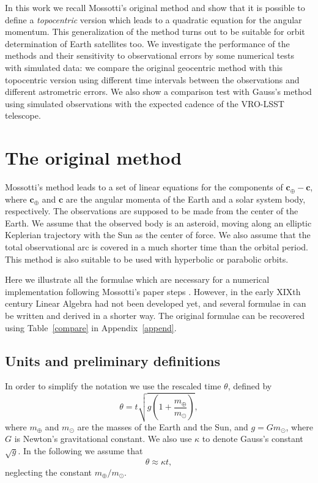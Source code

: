 \documentclass[11pt]{article}
\def\angmom{\bm{c}}
\def\angmom{{\bm{c}}}
\begin{document}
In this work we recall Mossotti's original method and show that it is possible to define a {\em topocentric} version which leads to a quadratic equation for the angular momentum.
This generalization of the method turns out to be suitable for orbit determination of Earth satellites too. 
We investigate the performance of the methods and their sensitivity to observational errors by some numerical tests with simulated data: we compare the original geocentric method with this topocentric version using different time intervals between the observations and different astrometric errors. 
We also show a comparison test with Gauss's method using simulated observations with the expected cadence of the VRO-LSST telescope.



\section{The original method}
\label{s:mossotti_geo}

Mossotti's method \cite{mossotti} leads to a set of linear equations for the components of $\angmom_\oplus-\angmom$, where $\angmom_\oplus$ and $\angmom$ are the angular momenta of the Earth and a solar system body, respectively. 
The observations are supposed to be made from the center of the Earth. 
We assume that the observed body is an asteroid, moving along an elliptic Keplerian trajectory with the Sun as the center of force. 
We also assume that the total observational arc is covered in a much shorter time than the orbital period. 
This method is also suitable to be used with hyperbolic or parabolic orbits.

Here we illustrate all the formulae which are necessary for a numerical implementation following Mossotti's paper steps \cite{mossotti}. 
However, in the early XIXth century Linear Algebra had not been developed yet, and several formulae in \cite{mossotti} can be written and derived in a shorter way.  
The original formulae can be recovered using Table~\ref{compare} in Appendix~\ref{append}.


\subsection{Units and preliminary definitions}

In order to simplify the notation we use the rescaled time $\theta$, defined by
\begin{equation*}
    \theta = t\sqrt{g\left(1+\frac{m_\oplus}{m_\odot}\right)},
\end{equation*}
where $m_\oplus$ and $m_\odot$ are the masses of the Earth and the Sun, and $g=Gm_\odot$, where $G$ is Newton's gravitational constant.
We also use $\kappa$ to denote Gauss's constant $\sqrt{g}$.
In the following we assume that
\begin{equation*}
    \theta \approx \kappa t,
\end{equation*}
neglecting the constant ${m_\oplus}/{m_\odot}$.
\end{document}
